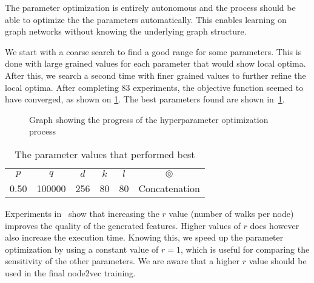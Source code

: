 
The parameter optimization is entirely autonomous and the process should be able to optimize the the parameters automatically. This enables learning on graph networks without knowing the underlying graph structure.

We start with a coarse search to find a good range for some parameters. This is done with large grained values for each parameter that would show local optima. After this, we search a second time with finer grained values to further refine the local optima. After completing 83 experiments, the objective function seemed to have converged, as shown on \cref{fig:spearmint}. The best parameters found are shown in~\cref{tab:paramopt_goodvalues}.

\begin{figure}%
  \centering
  
\caption[Hyperparameter optimization]{Graph showing the progress of the hyperparameter optimization process}%
\label{fig:spearmint}%
\end{figure}

\begin{table}%
\centering
\begin{tabular}{cccccc}
\toprule
$p$  & $q$ & $d$ & $k$ & $l$ & $\circledcirc$\\
\num{0.50} & \num{100000} & 256 & 80  & 80 & Concatenation \\
\bottomrule
\end{tabular}
\caption[The parameter values found to perform the best]{The parameter values that performed best}%
\label{tab:paramopt_goodvalues}%
\end{table}

Experiments in~\cite{node2vec} show that increasing the $r$ value (number of walks per node) improves the quality of the generated features. Higher values of $r$ does however also increase the execution time. Knowing this, we speed up the parameter optimization by using a constant value of $r=1$, which is useful for comparing the sensitivity of the other parameters. We are aware that a higher $r$ value should be used in the final node2vec training.

